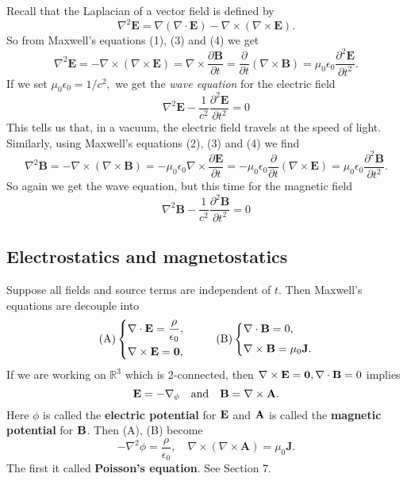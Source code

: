 Recall that the Laplacian of a vector field is defined by
\[
    \nabla^{2} \mathbf{E}=\nabla(\nabla \cdot \mathbf{E})-\nabla \times(\nabla \times \mathbf{E}).
\]
So from Maxwell's equations (1), (3) and (4) we get
\[
    \nabla^{2} \mathbf{E}=-\nabla \times(\nabla \times \mathbf{E})=\nabla \times \frac{\partial \mathbf{B}}{\partial t}=\frac{\partial}{\partial t}(\nabla \times \mathbf{B})=\mu_{0} \epsilon_{0} \frac{\partial^{2} \mathbf{E}}{\partial t^{2}}.
\]
If we set $\mu_{0} \epsilon_{0}=1 / c^{2},$ we get the \textit{wave equation} for the electric field
\[
    \boxed{\nabla^{2} \mathbf{E}-\frac{1}{c^{2}} \frac{\partial^{2} \mathbf{E}}{\partial t^{2}}=0}
\]
This tells us that, in a vacuum, the electric field travels at the speed of light. Similarly, using Maxwell's equations (2), (3) and (4) we find
\[
    \nabla^{2} \mathbf{B}=-\nabla \times(\nabla \times \mathbf{B})=-\mu_{0} \epsilon_{0} \nabla \times \frac{\partial \mathbf{E}}{\partial t}=-\mu_{0} \epsilon_{0} \frac{\partial}{\partial t}(\nabla \times \mathbf{E})=\mu_{0} \epsilon_{0} \frac{\partial^{2} \mathbf{B}}{\partial t^{2}}.
\]
So again we get the wave equation, but this time for the magnetic field
\[
    \boxed{\nabla^{2} \mathbf{B}-\frac{1}{c^{2}} \frac{\partial^{2} \mathbf{B}}{\partial t^{2}}=0}
\]

\subsection{Electrostatics and magnetostatics}
Suppose all fields and source terms are independent of $t$. Then Maxwell's equations are decouple into 
\[
    (\text{A})\left\{ \begin{aligned}
         &\nabla\cdot{\bf E} = \frac{\rho}{\epsilon_0},\\ 
         &\nabla\times{\bf E} = \mathbf{0},
    \end{aligned} \right. ~~~~~~~~ (\text{B})\left\{ \begin{aligned}
        &\nabla\cdot{\bf B} = 0,\\[3pt]
        &\nabla\times{\bf B} = \mu_0{\bf J}.
   \end{aligned} \right.
\]
If we are working on $ \mathbb{R}^{3} $ which is 2-connected, then $ \nabla\times{\bf E} = \mathbf{0},\nabla\cdot{\bf B}=0 $ implies 
\[
    {\bf E} = - \nabla_\phi\quad \text{and}\quad {\bf B} = \nabla\times{\bf A}.
\]
Here $ \phi $ is called the \textbf{electric potential} for ${\bf E}$ and $ {\bf A} $ is called the \textbf{magnetic potential} for $ {\bf B} $. Then (A), (B) become
\[
    -\nabla^{2} \phi=\frac{\rho}{\epsilon_{0}}, \quad \nabla \times(\nabla \times \mathbf{A})=\mu_{0} \mathbf{J}.
\]
The first it called \textbf{Poisson's equation}. See Section 7.

